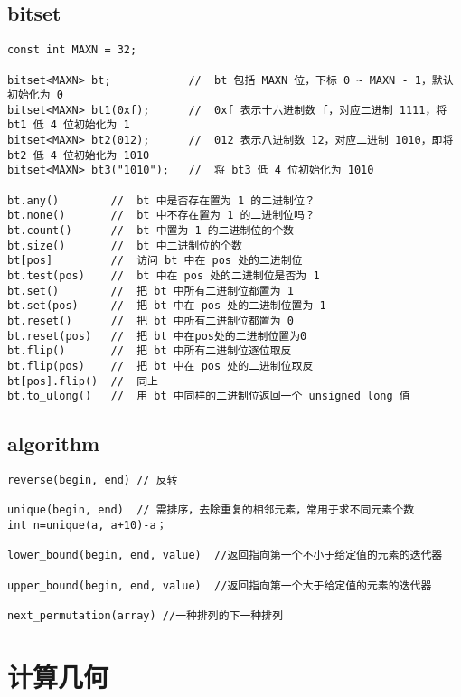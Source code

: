 \subsection{bitset}
\begin{lstlisting}
const int MAXN = 32;

bitset<MAXN> bt;            //  bt 包括 MAXN 位，下标 0 ~ MAXN - 1，默认初始化为 0
bitset<MAXN> bt1(0xf);      //  0xf 表示十六进制数 f，对应二进制 1111，将 bt1 低 4 位初始化为 1
bitset<MAXN> bt2(012);      //  012 表示八进制数 12，对应二进制 1010，即将 bt2 低 4 位初始化为 1010
bitset<MAXN> bt3("1010");   //  将 bt3 低 4 位初始化为 1010

bt.any()        //  bt 中是否存在置为 1 的二进制位？
bt.none()       //  bt 中不存在置为 1 的二进制位吗？
bt.count()      //  bt 中置为 1 的二进制位的个数
bt.size()       //  bt 中二进制位的个数
bt[pos]         //  访问 bt 中在 pos 处的二进制位
bt.test(pos)    //  bt 中在 pos 处的二进制位是否为 1
bt.set()        //  把 bt 中所有二进制位都置为 1
bt.set(pos)     //  把 bt 中在 pos 处的二进制位置为 1
bt.reset()      //  把 bt 中所有二进制位都置为 0
bt.reset(pos)   //  把 bt 中在pos处的二进制位置为0
bt.flip()       //  把 bt 中所有二进制位逐位取反
bt.flip(pos)    //  把 bt 中在 pos 处的二进制位取反
bt[pos].flip()  //  同上
bt.to_ulong()   //  用 bt 中同样的二进制位返回一个 unsigned long 值
\end{lstlisting}


\subsection{algorithm}
\begin{lstlisting}
reverse(begin, end)	// 反转

unique(begin, end)	// 需排序，去除重复的相邻元素，常用于求不同元素个数
int n=unique(a, a+10)-a；

lower_bound(begin, end, value)	//返回指向第一个不小于给定值的元素的迭代器

upper_bound(begin, end, value)	//返回指向第一个大于给定值的元素的迭代器

next_permutation(array)	//一种排列的下一种排列
\end{lstlisting}



\section{计算几何}
